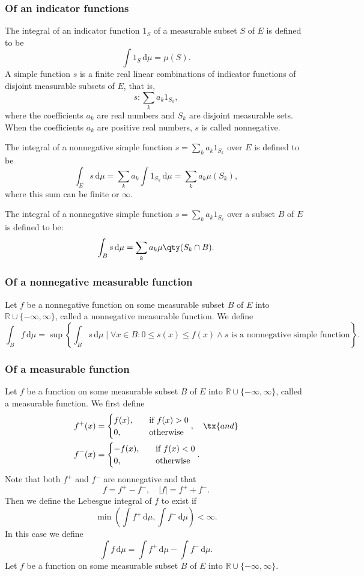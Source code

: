 \documentclass[a4paper,12pt]{report}
\begin{document}
\subsubsection{Of an indicator functions}
The integral of an indicator function $1_S$ of a measurable subset $S$ of $E$ is defined to be
\[\int 1_{S}\,\mathrm{d}{\mu} =\mu (S).\]
A simple function $s$ is a finite real linear combinations of indicator functions of disjoint measurable subsets of $E$, that is,
\[s\colon\sum_ka_k1_{S_k},\]
where the coefficients $a_k$ are real numbers and $S_k$ are disjoint measurable sets. When the coefficients $a_k$ are positive real numbers, $s$ is called nonnegative.

The integral of a nonnegative simple function $s=\sum_ka_k1_{S_k}$ over $E$ is defined to be
\[\int_Es\,\mathrm{d}\mu=\sum_ka_k\int 1_{S_k}\,\mathrm{d}\mu=\sum_ka_k\mu(S_k),\]
where this sum can be finite or $\infty$.

The integral of a nonnegative simple function $s=\sum_ka_k1_{S_k}$ over a subset $B$ of $E$ is defined to be:
\[\int_Bs\,\mathrm{d}\mu=\sum_ka_k\mu \qty(S_k\cap B).\]
\subsubsection{Of a nonnegative measurable function}
Let $f$ be a nonnegative function on some measurable subset $B$ of $E$ into $\mathbb{R}\cup\{-\infty,\infty\}$, called a nonnegative measurable function. We define
\[\int_Bf\,\mathrm{d}\mu=\sup\left\{\int_Bs\,\mathrm{d}\mu\mid\forall x\in B\colon 0\leq s(x)\leq f(x)\land s\text{\ is a nonnegative simple function}\right\}.\]
\subsubsection{Of a measurable function}
Let $f$ be a function on some measurable subset $B$ of $E$ into $\mathbb{R}\cup\{-\infty,\infty\}$, called a measurable function. We first define
\[\begin{aligned}
f^{+}(x)&=
\begin{cases}
f(x),\quad&\text{if\ }f(x)>0\\
0,\quad &\text{otherwise}
\end{cases},\quad\tx{and}\\
f^{-}(x)&=
\begin{cases}
-f(x),\quad&\text{if\ }f(x)<0\\
0,\quad&\text{otherwise}
\end{cases}.
\end{aligned}\]
Note that both $f^+$ and $f^-$ are nonnegative and that
\[f=f^+-f^-,\quad |f|=f^++f^-.\]
Then we define the Lebesgue integral of $f$ to exist if
\[ \min \left(\int f^{+}\,\mathrm{d}\mu ,\int f^{-}\,\mathrm{d}\mu \right)<\infty.\]
In this case we define
\[ \int f\,\mathrm{d}\mu =\int f^{+}\,\mathrm{d}\mu -\int f^{-}\,\mathrm{d}\mu.\]
Let $f$ be a function on some measurable subset $B$ of $E$ into $\mathbb{R}\cup\{-\infty,\infty\}$.
\end{document}
